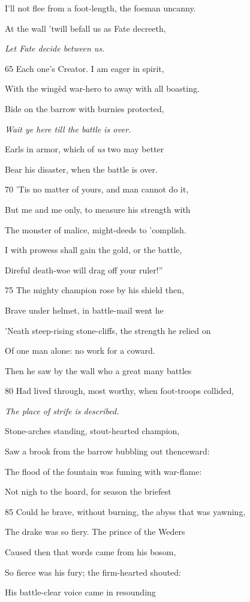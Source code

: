 I’ll not flee from a foot-length, the foeman uncanny.

At the wall ’twill befall us as Fate decreeth,

\emph{Let Fate decide
between us.}

65
Each one’s Creator. I am eager in spirit,

With the wingèd war-hero to away with all boasting.

Bide on the barrow with burnies protected,

\emph{Wait ye here till
the battle is over.}

Earls in armor, which of \emph{us} two may better

Bear his disaster, when the battle is over.

70
’Tis no matter of yours, and man cannot do it,

But me and me only, to measure his strength with

The monster of malice, might-deeds to ’complish.

I with prowess shall gain the gold, or the battle,

Direful death-woe will drag off your ruler!”

75
The mighty champion rose by his shield then,

Brave under helmet, in battle-mail went he

’Neath steep-rising stone-cliffs, the strength he relied on

Of one man alone: no work for a coward.

Then he saw by the wall who a great many battles

80
Had lived through, most worthy, when foot-troops collided,

\emph{The place of strife
is described.}

Stone-arches standing, stout-hearted champion,

Saw a brook from the barrow bubbling out thenceward:

The flood of the fountain was fuming with war-flame:

Not nigh to the hoard, for season the briefest

85
Could he brave, without burning, the abyss that was yawning,

The drake was so fiery. The prince of the Weders

Caused then that words came from his bosom,

So fierce was his fury; the firm-hearted shouted:

His battle-clear voice came in resounding

